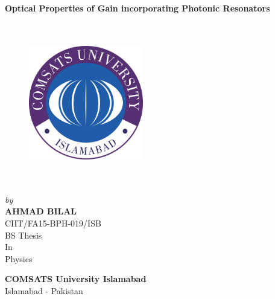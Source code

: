 \documentclass[12pt,twoside]{report}
\begin{document}
	\begin{center}
		
		\Large \textbf{Optical Properties of Gain incorporating Photonic Resonators}
		
	\end{center}
\begin{center}
	\begin{figure}[h]
	\centering
	\includegraphics[width=5cm,height=7cm,keepaspectratio]{universitye.jpg}\\
	\end{figure}
\end{center}
	\begin{center}
		\emph{\large by}\\
		
		\Large \textbf{AHMAD BILAL}\\
		\Large CIIT/FA15-BPH-019/ISB\\
		\vfill
		\Large BS Thesis\\
		\Large In\\
		\Large Physics
	\end{center}
	\vfill
	\begin{center}
		\Large \textbf{COMSATS University Islamabad}\\
		\Large Islamabad - Pakistan
	\end{center}
	
\end{document}
